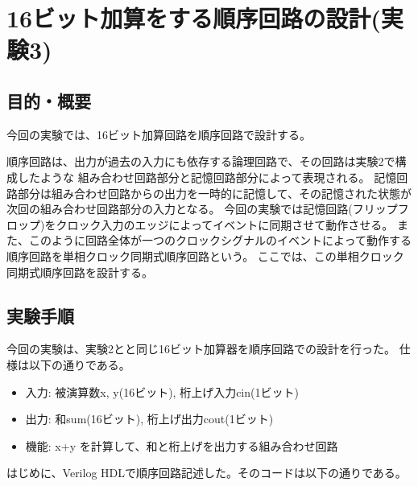 \documentclass[uplatex]{jsarticle}
\begin{document}
\clearpage

\section{16ビット加算をする順序回路の設計(実験3)}

\subsection{目的・概要}

今回の実験では、16ビット加算回路を順序回路で設計する。

順序回路は、出力が過去の入力にも依存する論理回路で、その回路は実験2で構成したような
組み合わせ回路部分と記憶回路部分によって表現される。
記憶回路部分は組み合わせ回路からの出力を一時的に記憶して、その記憶された状態が次回の組み合わせ回路部分の入力となる。
今回の実験では記憶回路(フリップフロップ)をクロック入力のエッジによってイベントに同期させて動作させる。
また、このように回路全体が一つのクロックシグナルのイベントによって動作する順序回路を単相クロック同期式順序回路という。
ここでは、この単相クロック同期式順序回路を設計する。

\subsection{実験手順}

今回の実験は、実験2とと同じ16ビット加算器を順序回路での設計を行った。
仕様は以下の通りである。

\begin{itemize}
  \item 入力: 被演算数x, y(16ビット), 桁上げ入力cin(1ビット)
  \item 出力: 和sum(16ビット), 桁上げ出力cout(1ビット)
  \item 機能: x+y を計算して、和と桁上げを出力する組み合わせ回路
\end{itemize}

はじめに、Verilog HDLで順序回路記述した。そのコードは以下の通りである。


\end{document}
